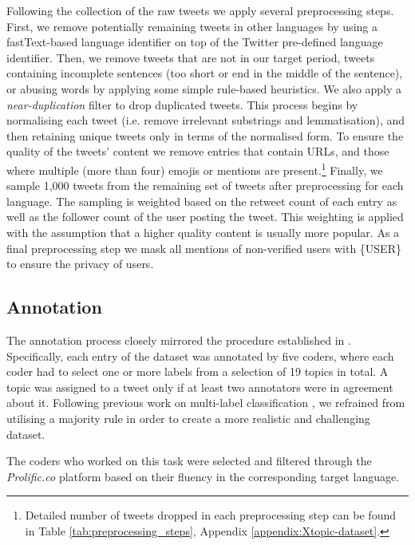 Following the collection of the raw tweets we apply several preprocessing steps. First, we remove potentially remaining tweets in other languages by using a fastText-based language identifier \cite{bojanowski2017enriching} on top of the Twitter pre-defined language identifier. Then, we remove tweets that are not in our target period, tweets containing incomplete sentences (too short or end in the middle of the sentence), or abusing words by applying some simple rule-based heuristics. We also apply a \textit{near-duplication} filter to drop duplicated tweets. This process begins by normalising each tweet (i.e. remove irrelevant substrings and lemmatisation), and then retaining unique tweets only in terms of the normalised form. To ensure the quality of the tweets' content we remove entries that contain URLs, and those where multiple (more than four) emojis or mentions are present.\footnote{Detailed number of tweets dropped in each preprocessing step can be found in Table \ref{tab:preprocessing_steps}, Appendix \ref{appendix:Xtopic-dataset}.} Finally, we sample 1,000 tweets from the remaining set of tweets after preprocessing for each language. The sampling is weighted based on the retweet count of each entry as well as the follower count of the user posting the tweet. This weighting is applied with the assumption that a higher quality content is usually more popular. As a final preprocessing step we mask all mentions of non-verified users with \{USER\} to ensure the privacy of users. 



\subsection{Annotation}
\label{sec:annotation}
The annotation process closely mirrored the procedure established in {\TweetTopic}. Specifically, each entry of the dataset was annotated by five coders, where each coder had to select one or more labels from a selection of 19 topics in total. A topic was assigned to a tweet only if at least two annotators were in agreement about it. Following previous work on multi-label classification \cite{mohammad2018semeval}, we refrained from utilising a majority rule in order to create a more realistic and challenging dataset.



The coders who worked on this task were selected and filtered through the \textit{Prolific.co} platform based on their fluency in the corresponding target language. 

